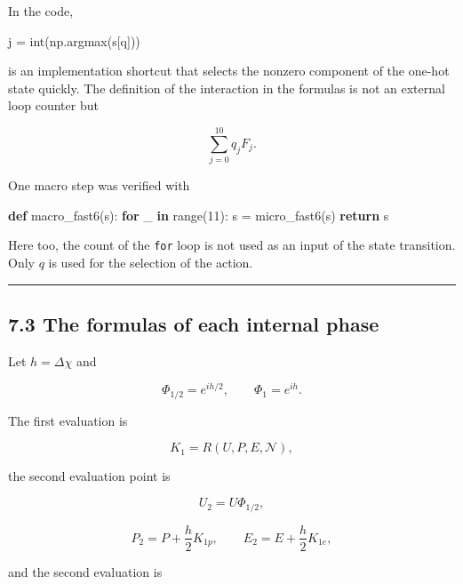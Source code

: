 \documentclass[
  a4paper,
]{article}
\newenvironment{Shaded}{}{}
\newcommand{\BuiltInTok}[1]{\textcolor[rgb]{0.00,0.50,0.00}{#1}}
\newcommand{\ControlFlowTok}[1]{\textcolor[rgb]{0.00,0.44,0.13}{\textbf{#1}}}
\newcommand{\DecValTok}[1]{\textcolor[rgb]{0.25,0.63,0.44}{#1}}
\newcommand{\KeywordTok}[1]{\textcolor[rgb]{0.00,0.44,0.13}{\textbf{#1}}}
\newcommand{\NormalTok}[1]{#1}
\newcommand{\OperatorTok}[1]{\textcolor[rgb]{0.40,0.40,0.40}{#1}}
\newcommand{\StringTok}[1]{\textcolor[rgb]{0.25,0.44,0.63}{#1}}
\begin{document}
In the code,

\begin{Shaded}
\begin{Highlighting}[]
\NormalTok{j }\OperatorTok{=} \BuiltInTok{int}\NormalTok{(np.argmax(s[}\StringTok{\textquotesingle{}q\textquotesingle{}}\NormalTok{]))}
\end{Highlighting}
\end{Shaded}

is an implementation shortcut that selects the nonzero component of the
one-hot state quickly. The definition of the interaction in the formulas
is not an external loop counter but

\[
\sum_{j=0}^{10}q_jF_j.
\]

One macro step was verified with

\begin{Shaded}
\begin{Highlighting}[]
\KeywordTok{def}\NormalTok{ macro\_fast6(s):}
    \ControlFlowTok{for}\NormalTok{ \_ }\KeywordTok{in} \BuiltInTok{range}\NormalTok{(}\DecValTok{11}\NormalTok{):}
\NormalTok{        s }\OperatorTok{=}\NormalTok{ micro\_fast6(s)}
    \ControlFlowTok{return}\NormalTok{ s}
\end{Highlighting}
\end{Shaded}

Here too, the count of the \texttt{for} loop is not used as an input of
the state transition. Only \(q\) is used for the selection of the
action.

\begin{center}\rule{0.5\linewidth}{0.5pt}\end{center}

\subsection{7.3 The formulas of each internal
phase}\label{the-formulas-of-each-internal-phase}

Let \(h=\Delta\chi\) and

\[
\Phi_{1/2}=e^{ih/2},
\qquad
\Phi_1=e^{ih}.
\]

The first evaluation is

\[
K_1=R(U,P,E,\mathcal N),
\]

the second evaluation point is

\[
U_2=U\Phi_{1/2},
\]

\[
P_2=P+\frac h2 K_{1p},
\qquad
E_2=E+\frac h2 K_{1e},
\]

and the second evaluation is
\end{document}
